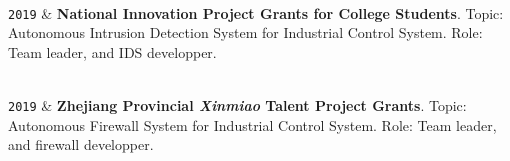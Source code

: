 \documentclass[9pt,a4paper]{article}
\newcommand{\Year}[1]{\fontsize{10pt}{0}\selectfont \texttt{#1}}
\begin{document}
\begin{EntriesTableYear}
  \\
  \Year{2019} & 
    \textbf{National Innovation Project Grants for College Students}.
    \newline
    Topic: Autonomous Intrusion Detection System for Industrial Control System.
    \newline
    Role: Team leader, and IDS developper.

  \\
  \Year{2019} & 
    \textbf{Zhejiang Provincial \emph{Xinmiao} Talent Project Grants}.
    \newline
    Topic: Autonomous Firewall System for Industrial Control System.
    \newline
    Role: Team leader, and firewall developper.

\end{EntriesTableYear}
\end{document}
